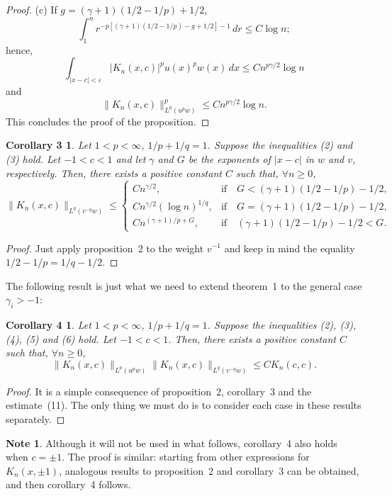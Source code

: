 \documentclass[a4paper,12pt]{article}
\theoremstyle{plain}
\newtheorem*{corThree}{Corollary 3}
\newtheorem*{corFour}{Corollary 4}
\theoremstyle{definition}
\newtheorem*{note}{Note}
\begin{document}
\begin{proof}
    (c) If $g = (\gamma +1) (1/2 - 1/p) + 1/2$,
$$
\int_{1}^{n} r^{-p [ (\gamma+1)(1/2 - 1/p) - g+1/2 ] -1} \,dr \leq C \log n;
$$
hence,
$$
\int_{| x - c | < \varepsilon} | K_{n}(x,c) |^{p} u(x)^{p} w(x)\,dx
\leq C n^{p\gamma/2} \log n
$$
and
$$
\| K_{n}(x,c) \|^{p}_{L^{p}(u^{p}w)} \leq C n^{p\gamma/2} \log n.
$$
This concludes the proof of the proposition.
\end{proof}

\begin{corThree}
Let $1 < p < \infty$, $1/p + 1/q = 1$.
Suppose the inequalities (2) and (3) hold. Let $-1 < c < 1$
and let $\gamma$ and $G$ be the exponents of $| x - c |$
in $w$ and $v$, respectively. Then, there exists a positive constant
$C$ such that, $\forall n \geq 0$,
$$
\| K_{n}(x,c) \|_{L^{q}(v^{-q}w)}
\leq
\begin{cases}
C n^{\gamma/2}, &\text{if}\quad G < (\gamma +1) (1/2 - 1/p) - 1/2,\\
C n^{\gamma/2} (\log n)^{1/q}, &\text{if}\quad G = (\gamma +1) (1/2 - 1/p) - 1/2,\\
C n^{(\gamma+1)/p + G}, &\text{if}\quad (\gamma +1) (1/2 - 1/p) - 1/2 < G.
\end{cases}
$$
\end{corThree}

\begin{proof}
Just apply proposition~2 to the weight $v^{-1}$ and keep in mind
the equality $1/2 - 1/p = 1/q - 1/2$.
\end{proof}

The following result is just what we need to extend theorem~1
to the general case $\gamma_{i} > -1$:

\begin{corFour}
Let $1 < p < \infty$, $1/p + 1/q = 1$.
Suppose the inequalities (2), (3), (4), (5) and (6) hold. Let $-1 < c < 1$.
Then, there exists a positive constant $C$ such that, $\forall n \geq 0$,
$$
\| K_{n}(x,c) \|_{L^{p}(u^{p}w)} \| K_{n}(x,c) \|_{L^{q}(v^{-q}w)}
\leq C K_{n}(c,c).
$$
\end{corFour}

\begin{proof}
It is a simple consequence of proposition~2, corollary~3 and
the estimate~(11). The only thing we must do is to consider each
case in these results separately.
\end{proof}

\begin{note}
Although it will not be used in what follows, corollary~4 also holds when $c = \pm 1$.
The proof is similar: starting from other expressions for $K_{n}(x,\pm 1)$,
analogous results to proposition~2 and corollary~3 can be obtained,
and then corollary~4 follows.
\end{note}
\end{document}
